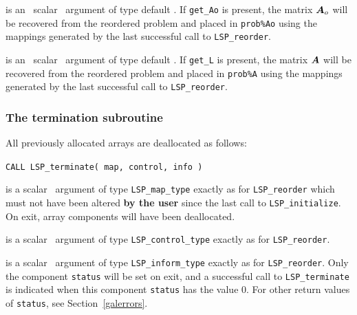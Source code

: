 \documentclass{galahad}
\newcommand{\packagename}{LSP}
\begin{document}
\begin{description}
is an \optional\ scalar \intentin\ argument of type default \logical. 
If {\tt get\_Ao} is present, the matrix ${\bm{A}}_o$
will be recovered from the reordered problem and placed in {\tt prob\%Ao} 
using the mappings generated by the last successful call to 
{\tt \packagename\_reorder}. 
 
is an \optional\ scalar \intentin\ argument of type default \logical. 
If {\tt get\_L} is present, the matrix ${\bm{A}}$
will be recovered from the reordered problem and placed in {\tt prob\%A} 
using the mappings generated by the last successful call to 
{\tt \packagename\_reorder}. 

\end{description}


\subsubsection{The  termination subroutine}
All previously allocated arrays are deallocated as follows:
\vspace*{1mm}

\hspace{8mm}
{\tt CALL \packagename\_terminate( map, control, info )}

\vspace*{-3mm}
\begin{description}

 is a scalar \intentinout\ argument of type 
{\tt \packagename\_map\_type} 
exactly as for 
{\tt \packagename\_reorder}
which must not have been altered {\bf by the user} since the last call to 
{\tt \packagename\_initialize}.
On exit, array components will have been deallocated.

 is a scalar \intentin\ argument of type 
{\tt \packagename\_control\_type}
exactly as for
{\tt \packagename\_reorder}.

 is a scalar \intentout\ argument of type 
{\tt \packagename\_inform\_type}
exactly as for
{\tt \packagename\_reorder}.
Only the component {\tt status} will be set on exit, and a 
successful call to 
{\tt \packagename\_terminate}
is indicated when this  component {\tt status} has the value 0. 
For other return values of {\tt status}, see Section~\ref{galerrors}.

\end{description}

\end{document}
